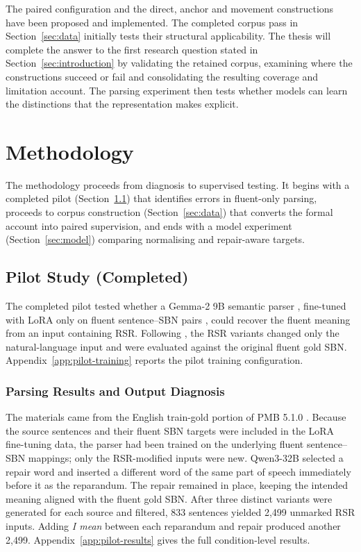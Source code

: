 \documentclass{article}
\begin{document}
The paired configuration and the direct, anchor and movement constructions
have been proposed and implemented. The completed corpus pass in
Section~\ref{sec:data} initially tests their structural applicability. The
thesis will complete the answer to the first research
question stated in Section~\ref{sec:introduction} by validating the retained corpus, examining where the constructions
succeed or fail and consolidating the resulting coverage and limitation
account. The parsing experiment then tests whether models can learn the
distinctions that the representation makes explicit.

\section{Methodology}
\label{sec:methodology}

The methodology proceeds from diagnosis to supervised testing. It begins with
a completed pilot (Section~\ref{sec:pilot}) that identifies errors in
fluent-only parsing, proceeds to corpus construction (Section~\ref{sec:data})
that converts the formal account into paired supervision, and ends with a model
experiment (Section~\ref{sec:model}) comparing normalising and repair-aware
targets.

\subsection{Pilot Study (Completed)}
\label{sec:pilot}

The completed pilot tested whether a Gemma-2 9B semantic parser
\citep{gemmateamGemma2Improving2024}, fine-tuned with LoRA only on fluent
sentence--SBN pairs \citep{huLoRALowRankAdaptation2021}, could recover the
fluent meaning from an input containing RSR. Following
\citet{senSemanticParsingDisfluent2021}, the RSR variants changed only the
natural-language input and were evaluated against the original fluent gold
SBN. Appendix~\ref{app:pilot-training}
reports the pilot training configuration.

\subsubsection{Parsing Results and Output Diagnosis}

The materials came from the English train-gold portion of PMB 5.1.0
\citep{abzianidzeParallelMeaningBank2017}. Because the source sentences and
their fluent SBN targets were included in the LoRA fine-tuning data, the parser
had been trained on the underlying fluent sentence--SBN mappings; only the
RSR-modified inputs were new. Qwen3-32B
\citep{yangQwen3TechnicalReport2025} selected a repair word and inserted a
different word of the same part of speech immediately before it as the
reparandum. The repair remained in place, keeping the intended meaning aligned
with the fluent gold SBN. After three distinct variants were generated for each source
and filtered, 833 sentences yielded 2,499 unmarked RSR inputs. Adding
\textit{I mean} between each reparandum and repair produced another 2,499.
Appendix~\ref{app:pilot-results} gives the full condition-level
results.
\end{document}
